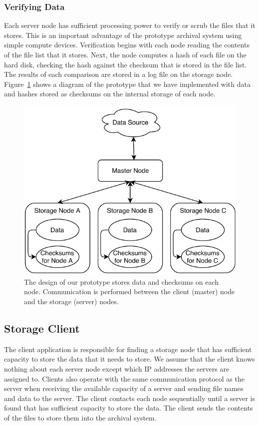 \subsubsection{Verifying Data}
Each server node has sufficient processing power to verify or scrub the files that it stores.  This is an important advantage of the prototype archival system using simple compute devices.  Verification begins with each node reading the contents of the file list that it stores.  Next, the node computes a hash of each file on the hard disk, checking the hash against the checksum that is stored in the file list.  The results of each comparison are stored in a log file on the storage node.  Figure~\ref{fig3} shows a diagram of the prototype that we have implemented with data and hashes stored as checksums on the internal storage of each node.

\begin{figure}[!ht]
\includegraphics[width=\linewidth]{fig3.pdf}
\caption{The design of our prototype stores data and checksums on each node.  Communication is performed between the client (master) node and the storage (server) nodes.}
\label{fig3}
\end{figure}

\subsection{Storage Client}
The client application is responsible for finding a storage node that has sufficient capacity to store the data that it needs to store.  We assume that the client knows nothing about each server node except which IP addresses the servers are assigned to.  Clients also operate with the same communication protocol as the server when receiving the available capacity of a server and sending file names and data to the server.   The client contacts each node sequentially until a server is found that has sufficient capacity to store the data.  The client sends the contents of the files to store them into the archival system.

